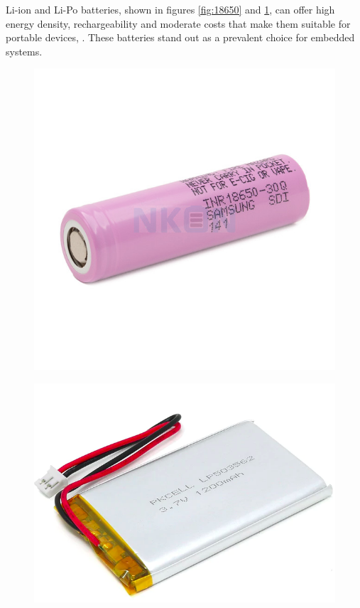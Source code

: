 \gls{Li-ion} and \gls{Li-Po} batteries, shown in figures \ref{fig:18650} and \ref{fig:lipo}, can offer high energy density, rechargeability and moderate costs that make them suitable for portable devices, \cite{BATT7}.
These batteries stand out as a prevalent choice for embedded systems.
\begin{figure}[H]
    \centering
    \begin{minipage}{.5\textwidth}
        \centering
        \includegraphics[width=.5\linewidth]{ch3/assets/18650.jpg}
        \label{fig:18650}
    \end{minipage}%
    \begin{minipage}{.5\textwidth}
        \centering
        \includegraphics[width=.5\linewidth]{ch3/assets/lipo.png}
        \label{fig:lipo}
    \end{minipage}
\end{figure}

